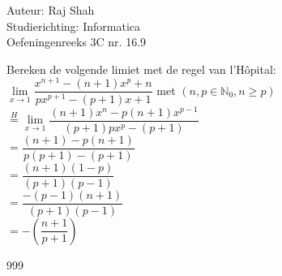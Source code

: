 \documentclass[a4paper]{article}
\begin{document}
  
\noindent \large Auteur: Raj Shah \\
\noindent \large Studierichting: Informatica\\
\noindent \large Oefeningenreeks 3C nr. 16.9 \\

\medskip

\normalsize

Bereken de volgende limiet met de regel van l'Hôpital: $\lim\limits_{x \rightarrow 1} \dfrac{x^{n+1} - (n+1)x^p + n}{px^{p+1} - (p + 1)x + 1} $ met $ (n, p \in \mathbb{N}_0, n \geq p)$\\

$\overset{H}{=}  \lim\limits_{x \rightarrow 1} \dfrac{(n+1)x^n - p(n+1)x^{p-1}}{(p+1)px^p - (p+1)}$\\

$ = \dfrac{(n+1) - p(n+1)}{p(p+1) - (p+1)}$\\

$ = \dfrac{(n+1)(1-p)}{(p+1)(p-1)}$\\

$ = \dfrac{-(p-1)(n+1)}{(p+1)(p-1)}$\\

$ = - \left(\dfrac{n+1}{p+1}\right)$


\begin{thebibliography}{999}
\end{thebibliography}
\end{document}

